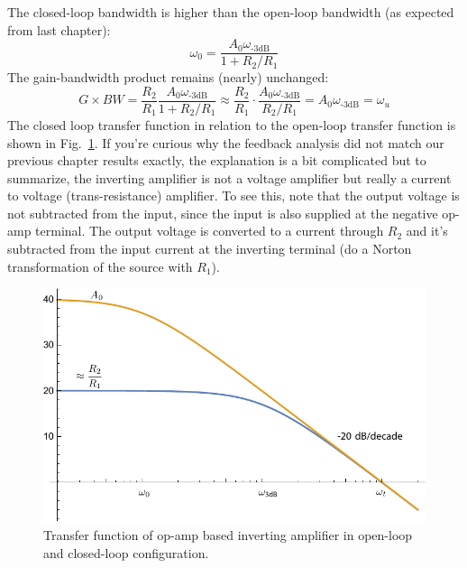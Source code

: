The closed-loop bandwidth is higher than the open-loop bandwidth (as expected from last chapter):
    \begin{equation} 
        \omega_{0} = \frac{A_0 \omega_{\text{-3dB}}}{ 1 + R_2/R_1} 
    \end{equation}
The gain-bandwidth product remains (nearly) unchanged:
    \begin{equation} 
        G \times BW = \frac{R_2}{R_1} \frac{A_0 \omega_\text{-3dB}}{ 1 + R_2/R_1} \approx \frac{R_2}{R_1} \cdot \frac{A_0 \omega_\text{-3dB}}{R_2/R_1} = A_0 \omega_\text{-3dB} = \omega_u
    \end{equation}
The closed loop transfer function in relation to the open-loop transfer function is shown in Fig.~\ref{fig:mag1pole_fb_label}.  If you're curious why the feedback analysis did not match our previous chapter results exactly, the explanation is a bit complicated but to summarize, the inverting amplifier is not a voltage amplifier but really a current to voltage (trans-resistance) amplifier.  To see this, note that the output voltage is not subtracted from the input, since the input is also supplied at the negative op-amp terminal. The output voltage is converted to a current through $R_2$ and it's subtracted from the input current at the inverting terminal (do a Norton transformation of the source with $R_1$).
\begin{figure}[tb]
\centering
\includegraphics[scale=1]{mag1pole_fb_label}
\caption{Transfer function of op-amp based inverting amplifier in open-loop and closed-loop configuration.}
\label{fig:mag1pole_fb_label}
\end{figure}
